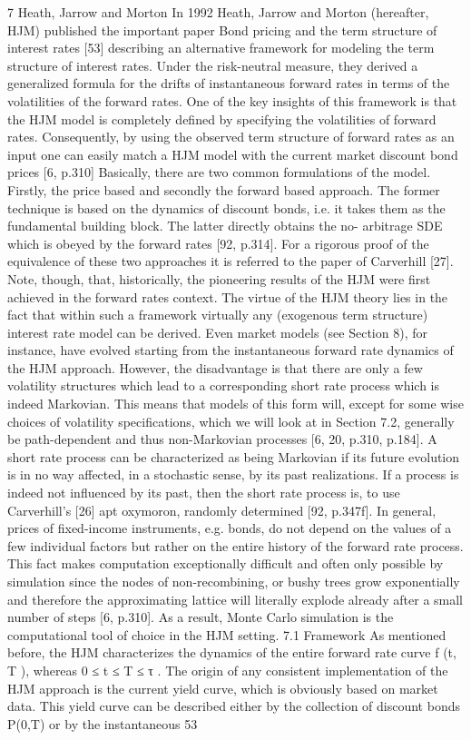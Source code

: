 7 Heath, Jarrow and Morton
In 1992 Heath, Jarrow and Morton (hereafter, HJM) published the important paper Bond pricing and the term structure of interest rates [53] describing an alternative framework for modeling the term structure of interest rates. Under the risk-neutral measure, they derived a generalized formula for the drifts of instantaneous forward rates in terms of the volatilities of the forward rates. One of the key insights of this framework is that the HJM model is completely defined by specifying the volatilities of forward rates. Consequently, by using the observed term structure of forward rates as an input one can easily match a HJM model with the current market discount bond prices [6, p.310]
Basically, there are two common formulations of the model. Firstly, the price based and secondly the forward based approach. The former technique is based on the dynamics of discount bonds, i.e. it takes them as the fundamental building block. The latter directly obtains the no- arbitrage SDE which is obeyed by the forward rates [92, p.314]. For a rigorous proof of the equivalence of these two approaches it is referred to the paper of Carverhill [27]. Note, though, that, historically, the pioneering results of the HJM were first achieved in the forward rates context.
The virtue of the HJM theory lies in the fact that within such a framework virtually any (exogenous term structure) interest rate model can be derived. Even market models (see Section 8), for instance, have evolved starting from the instantaneous forward rate dynamics of the HJM approach. However, the disadvantage is that there are only a few volatility structures which lead to a corresponding short rate process which is indeed Markovian. This means that models of this form will, except for some wise choices of volatility specifications, which we will look at in Section 7.2, generally be path-dependent and thus non-Markovian processes [6, 20, p.310, p.184]. A short rate process can be characterized as being Markovian if its future evolution is in no way affected, in a stochastic sense, by its past realizations. If a process is indeed not influenced by its past, then the short rate process is, to use Carverhill’s [26] apt oxymoron, randomly determined [92, p.347f].
In general, prices of fixed-income instruments, e.g. bonds, do not depend on the values of a few individual factors but rather on the entire history of the forward rate process. This fact makes computation exceptionally difficult and often only possible by simulation since the nodes of non-recombining, or bushy trees grow exponentially and therefore the approximating lattice will literally explode already after a small number of steps [6, p.310]. As a result, Monte Carlo simulation is the computational tool of choice in the HJM setting.
7.1 Framework
As mentioned before, the HJM characterizes the dynamics of the entire forward rate curve f (t, T ), whereas 0 ≤ t ≤ T ≤ τ . The origin of any consistent implementation of the HJM approach is the current yield curve, which is obviously based on market data. This yield curve can be described either by the collection of discount bonds P(0,T) or by the instantaneous
53

